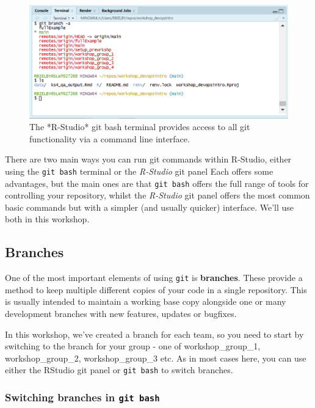 \documentclass[
  12pt,
]{article}
\begin{document}
\begin{figure}

{\centering \includegraphics[width=0.5\linewidth]{images/gitdemo/gitDemo-RStudio_gitterminal} 

}

\caption{The *R-Studio* git bash terminal provides access to all git functionality via a command line interface.}\label{fig:unnamed-chunk-9}
\end{figure}

There are two main ways you can run git commands within R-Studio, either
using the \texttt{git\ bash} terminal or the \emph{R-Studio} git panel
Each offers some advantages, but the main ones are that
\texttt{git\ bash} offers the full range of tools for controlling your
repository, whilst the \emph{R-Studio} git panel offers the most common
basic commands but with a simpler (and usually quicker) interface. We'll
use both in this workshop.

\hypertarget{branches}{%
\subsection{Branches}\label{branches}}

One of the most important elements of using \texttt{git} is
\textbf{branches}. These provide a method to keep multiple different
copies of your code in a single repository. This is usually intended to
maintain a working base copy alongside one or many development branches
with new features, updates or bugfixes.

In this workshop, we've created a branch for each team, so you need to
start by switching to the branch for your group - one of
workshop\_group\_1, workshop\_group\_2, workshop\_group\_3 etc. As in
most cases here, you can use either the RStudio git panel or
\texttt{git\ bash} to switch branches.

\hypertarget{switching-branches-in-git-bash}{%
\subsubsection{\texorpdfstring{Switching branches in
\texttt{git\ bash}}{Switching branches in git bash}}\label{switching-branches-in-git-bash}}
\end{document}
